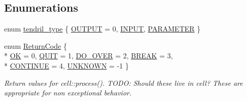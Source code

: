 \subsection*{Enumerations}
\begin{DoxyCompactItemize}
\item 
enum \hyperlink{namespaceecto_a02939764b22968505f82e425c83272c2}{tendril\-\_\-type} \{ \hyperlink{namespaceecto_a02939764b22968505f82e425c83272c2a2a607ed53342989a455e71bf3a78cb08}{O\-U\-T\-P\-U\-T} = 0, 
\hyperlink{namespaceecto_a02939764b22968505f82e425c83272c2adf3175f3e2ad3637b6fca943b4cc7672}{I\-N\-P\-U\-T}, 
\hyperlink{namespaceecto_a02939764b22968505f82e425c83272c2a39346743c7a624185996a561642a9aaa}{P\-A\-R\-A\-M\-E\-T\-E\-R}
 \}
\item 
enum \hyperlink{namespaceecto_a93d82cd28db695d53963fb696582762c}{Return\-Code} \{ \\*
\hyperlink{namespaceecto_a93d82cd28db695d53963fb696582762ca047df8448e71f9fc10f4fe310b0a4de7}{O\-K} = 0, 
\hyperlink{namespaceecto_a93d82cd28db695d53963fb696582762ca6803dad912ff60afb751d630ba35f0b3}{Q\-U\-I\-T} = 1, 
\hyperlink{namespaceecto_a93d82cd28db695d53963fb696582762caa83c6c7678d27bc12006c6343229f841}{D\-O\-\_\-\-O\-V\-E\-R} = 2, 
\hyperlink{namespaceecto_a93d82cd28db695d53963fb696582762cab1a50eb818462b09d2aeed53db036ede}{B\-R\-E\-A\-K} = 3, 
\\*
\hyperlink{namespaceecto_a93d82cd28db695d53963fb696582762caa00c877a06d58c100c7b0788c6c38b0a}{C\-O\-N\-T\-I\-N\-U\-E} = 4, 
\hyperlink{namespaceecto_a93d82cd28db695d53963fb696582762caed3dfd705e16962aacd0ba04103fa6cc}{U\-N\-K\-N\-O\-W\-N} = -\/1
 \}
\begin{DoxyCompactList}\small\item\em Return values for cell\-::process(). T\-O\-D\-O\-: Should these live in cell? These are appropriate for non exceptional behavior. \end{DoxyCompactList}\end{DoxyCompactItemize}
